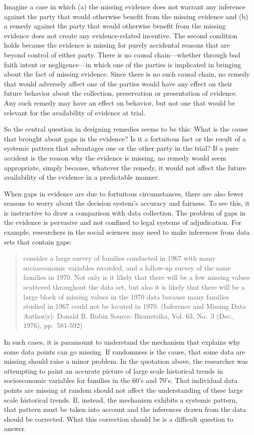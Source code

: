 \documentclass[
  10pt,
  dvipsnames,enabledeprecatedfontcommands]{scrartcl}
\begin{document}
Imagine a case in which (a) the missing evidence does not warrant any
inference against the party that would otherwise benefit from the
missing evidence and (b) a remedy against the party that would otherwise
benefit from the missing evidence does not create any evidence-related
incentive. The second condition holds because the evidence is missing
for purely accidental reasons that are beyond control of either party.
There is no causal chain---whether through bad faith intent or
negligence---in which one of the parties is implicated in bringing about
the fact of missing evidence. Since there is no such causal chain, no
remedy that would adversely affect one of the parties would have any
effect on their future behavior about the collection, preservation or
presentation of evidence. Any such remedy may have an effect on
behavior, but not one that would be relevant for the availability of
evidence at trial.

So the central question in designing remedies seems to be this: What is
the cause that brought about gaps in the evidence? Is it a fortuitous
fact or the result of a systemic pattern that advantages one or the
other party in the trial? If a pure accident is the reason why the
evidence is missing, no remedy would seem appropriate, simply because,
whatever the remedy, it would not affect the future availability of the
evidence in a predictable manner.

When gaps in evidence are due to fortuitous circumstances, there are
also fewer reasons to worry about the decision system's accuracy and
fairness. To see this, it is instructive to draw a comparison with data
collection. The problem of gaps in the evidence is pervasive and not
confined to legal systems of adjudication. For example, researchers in
the social sciences may need to make inferences from data sets that
contain gaps:

\begin{quote}
consider a large survey of families conducted in 1967 with many
socioeconomic variables recorded, and a follow-up survey of the same
families in 1970. Not only is it likely that there will be a few missing
values scattered throughout the data set, but also it is likely that
there will be a large block of missing values in the 1970 data because
many families studied in 1967 could not be located in 1970. (Inference
and Missing Data Author(s): Donald B. Rubin Source: Biometrika, Vol. 63,
No.~3 (Dec., 1976), pp.~581-592)
\end{quote}

\noindent In such cases, it is paramount to understand the mechanism
that explains why some data points can go missing. If randomness is the
cause, that some data are missing should raise a minor problem. In the
quotation above, the researcher was attempting to paint an accurate
picture of large scale historical trends in socioeconomic variables for
families in the 60's and 70's. That individual data points are missing
at random should not affect the understanding of these large scale
historical trends. If, instead, the mechanism exhibits a systemic
pattern, that pattern must be taken into account and the inferences
drawn from the data should be corrected. What this correction should be
is a difficult question to answer.
\end{document}
